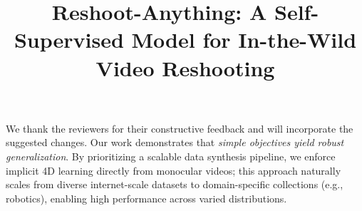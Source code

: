 \documentclass[10pt,twocolumn,letterpaper]{article}
\newcommand{\fv}[1]{{\color{Red}\textbf{#1}}}   %
\newcommand{\sv}[1]{{\color{Green}\textbf{#1}}} %
\newcommand{\tv}[1]{{\color{Blue}\textbf{#1}}}  %
\begin{document}
\title{\vspace{-0.5cm}Reshoot-Anything: A Self-Supervised Model for In-the-Wild Video Reshooting\vspace{-0.5cm}} 

\maketitle
\thispagestyle{empty}
\appendix


\noindent We thank the reviewers for their constructive feedback and will incorporate the suggested changes. Our work demonstrates that \textit{simple objectives yield robust generalization}. By prioritizing a scalable data synthesis pipeline, we enforce implicit 4D learning directly from monocular videos; this approach naturally scales from diverse internet-scale datasets to domain-specific collections (e.g., robotics), enabling high performance across varied distributions.

\end{document}

